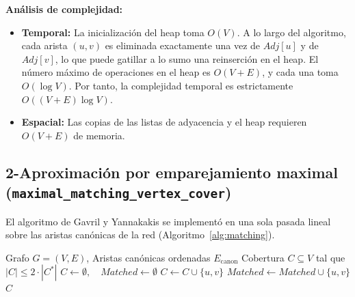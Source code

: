 \documentclass[11pt,a4paper]{article}
\begin{document}
\textbf{Análisis de complejidad:}
\begin{itemize}[itemsep=1pt]
	\item \textbf{Temporal:} La inicialización del heap toma $O(V)$. A lo largo del algoritmo, cada arista $(u, v)$ es eliminada exactamente una vez de $Adj[u]$ y de $Adj[v]$, lo que puede gatillar a lo sumo una reinserción en el heap. El número máximo de operaciones en el heap es $O(V + E)$, y cada una toma $O(\log V)$. Por tanto, la complejidad temporal es estrictamente \textbf{$O((V + E) \log V)$}.
	\item \textbf{Espacial:} Las copias de las listas de adyacencia y el heap requieren $O(V + E)$ de memoria.
\end{itemize}

\subsection{2-Aproximación por emparejamiento maximal (\texttt{maximal\_matching\_vertex\_cover})}
El algoritmo de Gavril y Yannakakis se implementó en una sola pasada lineal sobre las aristas canónicas de la red (Algoritmo~\ref{alg:matching}).

\begin{algorithm}[H]
\caption{2-Aproximación por Emparejamiento Maximal}
\label{alg:matching}
\begin{algorithmic}[1]
\Require Grafo $G = (V, E)$, Aristas canónicas ordenadas $E_{\text{canon}}$
\Ensure Cobertura $C \subseteq V$ tal que $|C| \le 2 \cdot |C^*|$
\State $C \gets \emptyset, \quad Matched \gets \emptyset$
		\State $C \gets C \cup \{u, v\}$
		\State $Matched \gets Matched \cup \{u, v\}$
	\EndIf
\EndFor
\State \Return $C$
\end{algorithmic}
\end{algorithm}
\end{document}
